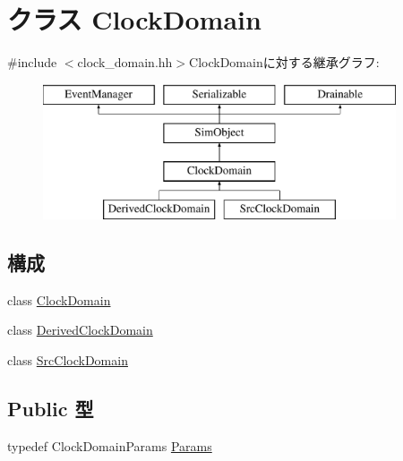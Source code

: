\hypertarget{classClockDomain}{
\section{クラス ClockDomain}
\label{classClockDomain}
}


{\ttfamily \#include $<$clock\_\-domain.hh$>$}ClockDomainに対する継承グラフ:\begin{figure}[H]
\begin{center}
\leavevmode
\includegraphics[height=4cm]{classClockDomain}
\end{center}
\end{figure}
\subsection*{構成}
\begin{DoxyCompactItemize}
\item 
class \hyperlink{classClockDomain_1_1ClockDomain}{ClockDomain}
\item 
class \hyperlink{classClockDomain_1_1DerivedClockDomain}{DerivedClockDomain}
\item 
class \hyperlink{classClockDomain_1_1SrcClockDomain}{SrcClockDomain}
\end{DoxyCompactItemize}
\subsection*{Public 型}
\begin{DoxyCompactItemize}
\item 
typedef ClockDomainParams \hyperlink{classClockDomain_a38704c6bd51f0677b46da34c8fe16a38}{Params}
\end{DoxyCompactItemize}
